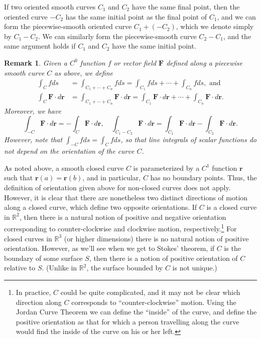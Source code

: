 \documentclass[12pt,letterpaper]{article}
\newtheorem{rem}[theorem]{Remark}
\newenvironment{remark}{\begin{rem}\rm}{\end{rem}}
\newcommand{\R}{\mathbb{R}}
\renewcommand{\r}{\mathbf{r}}
\begin{document}
If two oriented smooth curves $C_1$ and $C_2$ have the same final point, then the oriented curve $-C_2$ has the same initial point as the final point of $C_1$, and we can form the piecewise-smooth oriented curve $C_1+(-C_2)$, which we denote simply by $C_1-C_2$. We can similarly form the piecewise-smooth curve $C_2-C_1$, and the same argument holds if $C_1$ and $C_2$ have the same initial point.
\begin{remark}
Given a $C^0$ function $f$ or vector field $\mathbf{F}$ defined along a piecewise smooth curve $C$ as above, we define
\begin{align*}
\int_C f ds &= \int_{C_1+\cdots +C_n} f ds = \int_{C_1} f ds + \cdots +\int_{C_n} f ds, \text{ and }\\
\int_C \mathbf{F}\cdot d\r &= \int_{C_1+\cdots +C_n} \mathbf{F}\cdot d\r = \int_{C_1} \mathbf{F}\cdot d\r+\cdots +\int_{C_n}\mathbf{F}\cdot d\r.
\end{align*}
Moreover, we have
\[
\int_{-C}\mathbf{F}\cdot d\r = -\int_{C}\mathbf{F}\cdot d\r, \quad \int_{C_1-C_2}\mathbf{F}\cdot d\r = \int_{C_1}\mathbf{F}\cdot d\r-\int_{C_2}\mathbf{F}\cdot d\r.
\]
However, note that $\displaystyle \int_{-C} fds = \int_{C}fds$, so that line integrals of scalar functions do not depend on the orientation of the curve $C$.
\end{remark}
As noted above, a smooth closed curve $C$ is parameterized by a $C^1$ function $\r$ such that $\r(a)=\r(b)$, and in particular, $C$ has no boundary points. Thus, the definition of orientation given above for non-closed curves does not apply. However, it is clear that there are nonetheless two distinct directions of motion along a closed curve, which define two opposite orientations. If $C$ is a closed curve in $\R^2$, then there is a natural notion of positive and negative orientation corresponding to counter-clockwise and clockwise motion, respectively.\footnote{In practice, $C$ could be quite complicated, and it may not be clear which direction along $C$ corresponds to ``counter-clockwise'' motion. Using the Jordan Curve Theorem we can define the ``inside'' of the curve, and define the positive orientation as that for which a person travelling along the curve would find the inside of the curve on his or her left.} For closed curves in $\R^3$ (or higher dimensions) there is no natural notion of positive orientation. However, as we'll see when we get to Stokes' theorem, if $C$ is the boundary of some surface $S$, then there is a notion of positive orientation of $C$ relative to $S$. (Unlike in $\R^2$, the surface bounded by $C$ is not unique.) 
\end{document}
